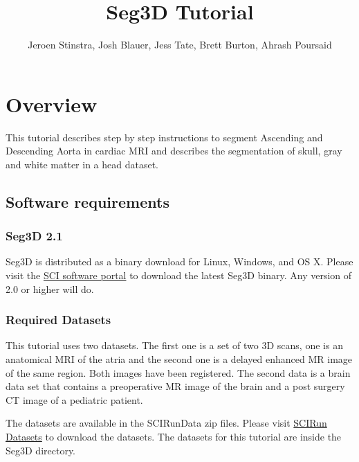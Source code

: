 \documentclass[fleqn,11pt,openany]{book}
\title{Seg3D Tutorial}
\author{Jeroen Stinstra, Josh Blauer, Jess Tate, Brett Burton, Ahrash Poursaid}
\begin{document}




\chapter{Overview}

\begin{introduction}

This tutorial describes step by step instructions to segment Ascending and Descending Aorta in cardiac MRI and describes the segmentation of skull, gray and white matter in a head dataset. 

\end{introduction}

\section{Software requirements}

\subsection{Seg3D 2.1}

Seg3D is distributed as a binary download for Linux, Windows, and OS X. Please visit the \href{http://software.sci.utah.edu}{SCI software portal} to download the latest Seg3D binary. Any version of 2.0 or higher will do. 

\subsection{Required Datasets}

This tutorial uses two datasets. The first one is a set  of two 3D scans, one is an anatomical MRI of the atria and the second one is a delayed enhanced MR image of the same region. Both images have been registered. The second data is a brain data set that contains a preoperative MR image of the brain and a post surgery CT image of a pediatric patient.

The datasets are available in the SCIRunData zip files. Please visit \href{http://www.sci.utah.edu/cibc/software/106-scirun.html}{SCIRun Datasets} to download the datasets. The datasets for this tutorial are inside the Seg3D directory.
\end{document}
